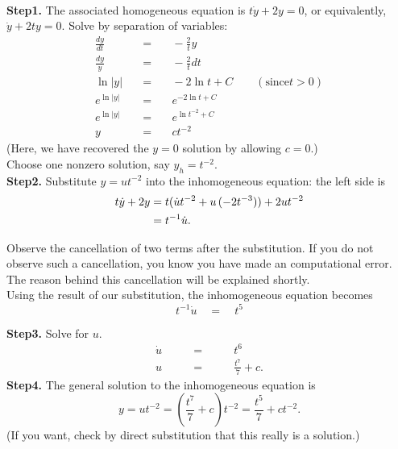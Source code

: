 \Solution \\
\textbf{Step1.} The associated homogeneous equation is $t\dot{y} + 2y = 0$,
or equivalently, $\dot{y} + 2ty = 0$. Solve by separation of variables:
\begin{eqnarray*}
  \frac{dy}{dt} \quad &=& \quad -\frac{2}{t}y\\
  \frac{dy}{y} \quad &=& \quad -\frac{2}{t}dt\\
  \ln{|y|} \quad &=& \quad -2 \ln{t} + C \qquad (\text{since} t > 0)\\
  \displaystyle e^{\ln{|y|}} \quad &=& \quad e^{-2 \ln{t} + C} \\
  \displaystyle e^{\ln{|y|}} \quad &=& \quad e^{\ln{t^{-2}} + C} \\
  y \quad &=& \quad ct^{-2}
\end{eqnarray*}
(Here, we have recovered the $y = 0$ solution by allowing $c = 0$.)\\
Choose one nonzero solution, say $\displaystyle y_h= t^{−2}$.\\
\textbf{Step2.} Substitute $y = ut^{−2}$ into the inhomogeneous equation: the left side is
\begin{align*}
  \displaystyle  \displaystyle t \dot{y} + 2y \displaystyle &=
  \displaystyle  t(\dot{u} t^{-2} + u\, (-2t^{-3})) + 2 u t^{-2}\\
  \displaystyle &= \displaystyle  t^{-1} \dot{u}.
\end{align*}

\Note Observe the cancellation of two terms after the substitution.
If you do not observe such a cancellation, you know you have made an computational error.
The reason behind this cancellation will be explained shortly. \\

Using the result of our substitution, the inhomogeneous equation becomes
\begin{equation*}
  \displaystyle  t^{-1} \dot{u} \quad \displaystyle =
  \quad \displaystyle t^5
\end{equation*}

\textbf{Step3.} Solve for $u$.
\begin{eqnarray*}
  \dot{u} \qquad &=& \qquad t^6 \\
  u \qquad &=& \qquad \frac{t^7}{7} + c.  
\end{eqnarray*}
\textbf{Step4.} The general solution to the inhomogeneous equation is
\begin{equation*}
  y = u t^{-2} = \left(\frac{t^7}{7} + c \right) t^{-2} = \frac{t^5}{7} + c t^{-2}.
\end{equation*}
(If you want, check by direct substitution that this really is a solution.)\\

